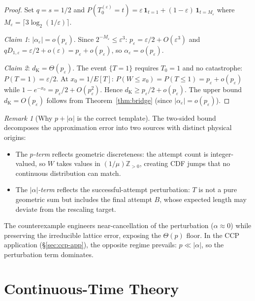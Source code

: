 \documentclass[11pt]{article}
\theoremstyle{plain}
\theoremstyle{definition}
\theoremstyle{remark}
\newtheorem{remark}[theorem]{Remark}
\newcommand{\dK}{d_{\mathrm{K}}}
\begin{document}
\begin{proof}
Set $q = s = 1/2$ and $P(T_0^{(\varepsilon)} = t) = \varepsilon\,\mathbf{1}_{t=1} + (1-\varepsilon)\,\mathbf{1}_{t = M_\varepsilon}$ where $M_\varepsilon = \lceil 3\log_2(1/\varepsilon)\rceil$.

\emph{Claim 1}: $|\alpha_\varepsilon| = o(p_\varepsilon)$.  Since $2^{-M_\varepsilon} \leq \varepsilon^3$: $p_\varepsilon = \varepsilon/2 + O(\varepsilon^3)$ and $qD_{1,\varepsilon} = \varepsilon/2 + o(\varepsilon) = p_\varepsilon + o(p_\varepsilon)$, so $\alpha_\varepsilon = o(p_\varepsilon)$.

\emph{Claim 2}: $\dK = \Theta(p_\varepsilon)$.  The event $\{T = 1\}$ requires $T_0 = 1$ and no catastrophe: $P(T = 1) = \varepsilon/2$.  At $x_0 = 1/E[T]$: $P(W \leq x_0) = P(T \leq 1) = p_\varepsilon + o(p_\varepsilon)$ while $1-e^{-x_0} = p_\varepsilon/2 + O(p_\varepsilon^2)$.  Hence $\dK \geq p_\varepsilon/2 + o(p_\varepsilon)$.  The upper bound $\dK = O(p_\varepsilon)$ follows from Theorem~\ref{thm:bridge} (since $|\alpha_\varepsilon| = o(p_\varepsilon)$).
\end{proof}

\begin{remark}[Why $p + |\alpha|$ is the correct template]\label{rem:template}
The two-sided bound decomposes the approximation error into two sources with distinct physical origins:
\begin{itemize}
  \item The \emph{$p$-term} reflects geometric discreteness: the attempt count is integer-valued, so $W$ takes values in $(1/\mu)\mathbb{Z}_{>0}$, creating CDF jumps that no continuous distribution can match.
  \item The \emph{$|\alpha|$-term} reflects the successful-attempt perturbation: $T$ is not a pure geometric sum but includes the final attempt $B$, whose expected length may deviate from the rescaling target.
\end{itemize}
The counterexample engineers near-cancellation of the perturbation ($\alpha \approx 0$) while preserving the irreducible lattice error, exposing the $\Theta(p)$ floor.  In the CCP application (\S\ref{sec:ccp-app}), the opposite regime prevails: $p \ll |\alpha|$, so the perturbation term dominates.
\end{remark}




\section{Continuous-Time Theory}\label{sec:continuous}
\end{document}
